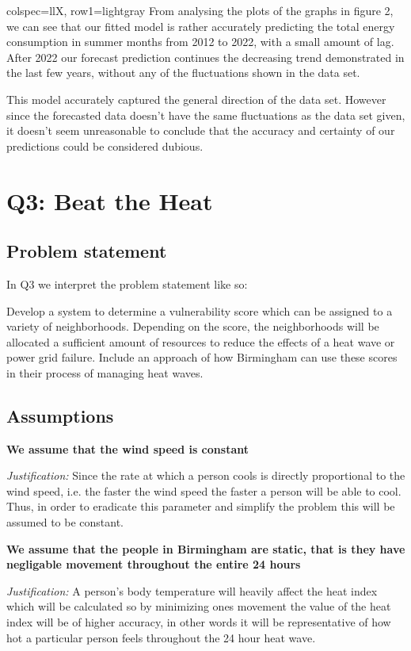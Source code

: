 \documentclass[11pt]{article}
\begin{document}
\begin{longtblr}[
  caption={Variables and parameters.}
]{
  colspec={llX},
  row{1}={lightgray}
}
From analysing the plots of the graphs in figure 2, we can see that our fitted model is rather accurately predicting the
total energy consumption in summer months from 2012 to 2022, with a small amount of lag. After 2022 our forecast prediction
continues the decreasing trend demonstrated in the last few years, without any of the fluctuations shown in the data set.

This model accurately captured the general direction of the data set. However since the forecasted data doesn't have the same
fluctuations as the data set given, it doesn't seem unreasonable to conclude that the accuracy and certainty of our
predictions could be considered dubious.

\section{Q3: Beat the Heat}
\subsection{Problem statement}

In Q3 we interpret the problem statement like so:

Develop a system to determine a vulnerability score which can be assigned to a  variety of neighborhoods. Depending on the score, the neighborhoods will be allocated a sufficient amount of resources to reduce the effects of a heat wave or power grid failure. Include an approach of how Birmingham can use these scores in their process of managing heat waves.

\subsection{Assumptions}
\textbf{\sffamily We assume that the wind speed is constant}

\textit{Justification:} Since the rate at which a person cools is directly proportional to the wind speed, i.e. the faster the wind speed the faster a person will be able to cool. Thus, in order to eradicate this parameter and simplify the problem this will be assumed to be constant.

\noindent
\textbf{\sffamily We assume that the people in Birmingham are static, that is they have negligable movement throughout the entire 24 hours}

\textit{Justification:} A person's body temperature will heavily affect the heat index which will be calculated so by minimizing ones movement the value of the heat index will be of higher accuracy, in other words it will be representative of how hot a particular person feels throughout the 24 hour heat wave. 


\end{longtblr}
\end{document}
